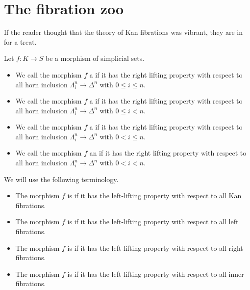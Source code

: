 \documentclass[main.tex]{subfiles}
\begin{document}
\newcommand{\ssmash}{\overset{\star}{\wedge}}

\chapter{The fibration zoo}
\label{ch:the_fibration_zoo}

If the reader thought that the theory of Kan fibrations was vibrant, they are in for a treat.

Let $f\colon K \to S$ be a morphism of simplicial sets.

\begin{itemize}
  \item We call the morphism $f$ a  if it has the right lifting property with respect to all horn inclusion $\Lambda^{n}_{i} \to \Delta^{n}$ with $0 \leq i \leq n$.

  \item We call the morphism $f$ a  if it has the right lifting property with respect to all horn inclusion $\Lambda^{n}_{i} \to \Delta^{n}$ with $0 \leq i < n$.

  \item We call the morphism $f$ a  if it has the right lifting property with respect to all horn inclusion $\Lambda^{n}_{i} \to \Delta^{n}$ with $0 < i \leq n$.

  \item We call the morphism $f$ an  if it has the right lifting property with respect to all horn inclusion $\Lambda^{n}_{i} \to \Delta^{n}$ with $0 < i < n$.
\end{itemize}

We will use the following terminology.
\begin{itemize}
  \item The morphism $f$ is  if it has the left-lifting property with respect to all Kan fibrations.

  \item The morphism $f$ is  if it has the left-lifting property with respect to all left fibrations.

  \item The morphism $f$ is  if it has the left-lifting property with respect to all right fibrations.

  \item The morphism $f$ is  if it has the left-lifting property with respect to all inner fibrations.
\end{itemize}
\end{document}
